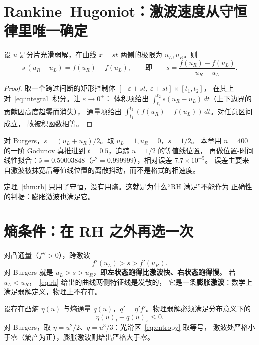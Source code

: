 \section{Rankine–Hugoniot：激波速度从守恒律里唯一确定}

\begin{theorem}
\label{thm:rh}
设 $u$ 是分片光滑弱解，在曲线 $x=s t$ 两侧的极限为 $u_L,u_R$。则
\begin{equation}
  s\,(u_R-u_L)=f(u_R)-f(u_L),
  \qquad\text{即}\qquad
  s=\frac{f(u_R)-f(u_L)}{u_R-u_L}.
  \label{eq:rh}
\end{equation}
\end{theorem}

\begin{proof}
取一个跨过间断的矩形控制体 $[-\varepsilon+s t,\ \varepsilon+s t]\times[t_1,t_2]$，
在其上对~\eqref{eq:integral} 积分。让 $\varepsilon\to0^+$：
体积项给出 $\int_{t_1}^{t_2}s(u_R-u_L)\,dt$（上下边界的贡献因高度趋零而消失），
通量项给出 $\int_{t_1}^{t_2}(f(u_R)-f(u_L))\,dt$。对任意区间成立，
故被积函数相等。
\end{proof}

对 Burgers，$s=(u_L+u_R)/2$。取 $u_L=1,u_R=0$，$s=1/2$。
本章用 $n=400$ 的一阶 Godunov 真推进到 $t=0.5$，追踪 $u=1/2$ 的等值线位置，
再做位置-时间线性拟合：$\hat s=0.50003848$（$r^2=0.999999$），相对误差 $7.7\times10^{-5}$。
误差主要来自激波被抹宽后等值线位置的离散抖动，而不是格式的相速度。

定理~\ref{thm:rh} 只用了守恒，没有用熵。这就是为什么``RH 满足''不能作为
正确性的判据：膨胀激波也满足它。

\section{熵条件：在 RH 之外再选一次}

\begin{definition}
对凸通量（$f''>0$），跨激波
\begin{equation}
  f'(u_L)>s>f'(u_R).
  \label{eq:lax}
\end{equation}
对 Burgers 就是 $u_L>s>u_R$，即\textbf{左状态跑得比激波快、右状态跑得慢}。
若 $u_L<u_R$，~\eqref{eq:rh} 给出的曲线两侧特征线是发散的，
它是一条\textbf{膨胀激波}：数学上满足弱解定义，物理上不存在。
\end{definition}

\begin{theorem}[熵不等式]
\label{thm:entropy}
设存在凸熵 $\eta(u)$ 与熵通量 $q(u)$，$q'=\eta'f'$。物理弱解必须满足分布意义下的
\begin{equation}
  \eta(u)_t+q(u)_x\le 0.
  \label{eq:entropy}
\end{equation}
对 Burgers，取 $\eta=u^2/2$、$q=u^3/3$：光滑区~\eqref{eq:entropy} 取等号，
激波处严格小于零（熵产为正），膨胀激波则给出严格大于零。
\end{theorem}

